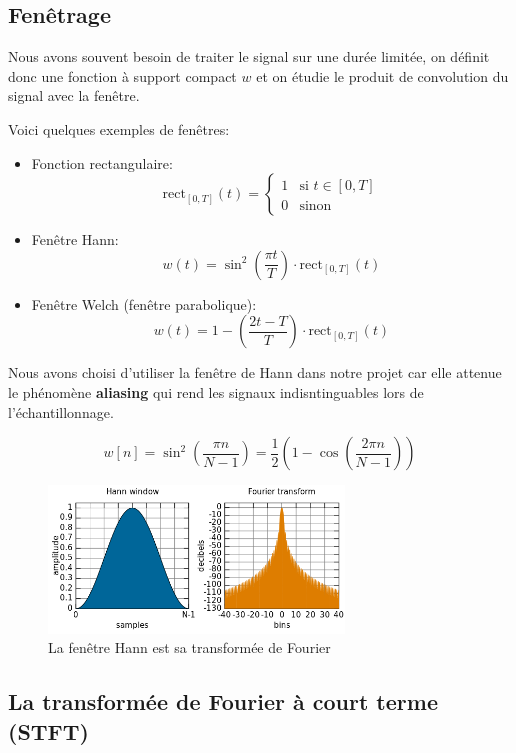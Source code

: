 \documentclass[french,]{article}
\providecommand{\tightlist}{%
  \setlength{\itemsep}{0pt}\setlength{\parskip}{0pt}}
\begin{document}
\hypertarget{fenetrage}{%
\subsection{Fenêtrage}\label{fenetrage}}

Nous avons souvent besoin de traiter le signal sur une durée limitée, on
définit donc une fonction à support compact \(w\) et on étudie le
produit de convolution du signal avec la fenêtre.

Voici quelques exemples de fenêtres:

\begin{itemize}
\tightlist
\item
  Fonction rectangulaire:
  \[ \mathrm{rect}_{[0,T]}(t) = \begin{cases} 1 &\text{si } t\in[0,T]\\0 &\text{sinon} \end{cases} \]
\item
  Fenêtre Hann:
  \[ w(t) = \sin^2 \left( \frac{\pi t}{T} \right) \cdot\mathrm{rect}_{[0,T]}(t) \]
\item
  Fenêtre Welch (fenêtre parabolique):
  \[ w(t) = 1 - \left( \frac{2t - T}{T} \right) \cdot\mathrm{rect}_{[0,T]}(t) \]
\end{itemize}

Nous avons choisi d'utiliser la fenêtre de Hann dans notre projet car
elle attenue le phénomène \textbf{aliasing} qui rend les signaux
indisntinguables lors de l'échantillonnage.

\[w[n] = \sin^2\left(\frac{\pi n}{N -1}\right)
    = \frac{1}{2}\left(1-\cos\left(\frac{2\pi n}{N -1}\right)\right)\]

\begin{figure}
\centering
\includegraphics[width=0.7\textwidth,height=\textheight]{img/Hann.png}
\caption{La fenêtre Hann est sa transformée de Fourier}
\end{figure}

\hypertarget{la-transformee-de-fourier-a-court-terme-stft}{%
\subsection{La transformée de Fourier à court terme
(STFT)}\label{la-transformee-de-fourier-a-court-terme-stft}}
\end{document}
